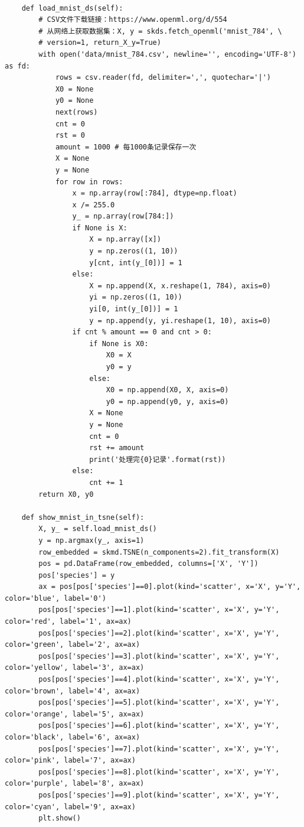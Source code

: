 \documentclass[UTF8]{article}
\begin{document}
\begin{lstlisting}
        
    def load_mnist_ds(self):
        # CSV文件下载链接：https://www.openml.org/d/554
        # 从网络上获取数据集：X, y = skds.fetch_openml('mnist_784', \
        # version=1, return_X_y=True)
        with open('data/mnist_784.csv', newline='', encoding='UTF-8') as fd:
            rows = csv.reader(fd, delimiter=',', quotechar='|')
            X0 = None
            y0 = None
            next(rows)
            cnt = 0
            rst = 0
            amount = 1000 # 每1000条记录保存一次
            X = None
            y = None
            for row in rows:
                x = np.array(row[:784], dtype=np.float)
                x /= 255.0
                y_ = np.array(row[784:])
                if None is X:
                    X = np.array([x])
                    y = np.zeros((1, 10))
                    y[cnt, int(y_[0])] = 1
                else:
                    X = np.append(X, x.reshape(1, 784), axis=0)
                    yi = np.zeros((1, 10))
                    yi[0, int(y_[0])] = 1
                    y = np.append(y, yi.reshape(1, 10), axis=0)
                if cnt % amount == 0 and cnt > 0:
                    if None is X0:
                        X0 = X
                        y0 = y
                    else:
                        X0 = np.append(X0, X, axis=0)
                        y0 = np.append(y0, y, axis=0)
                    X = None
                    y = None
                    cnt = 0
                    rst += amount
                    print('处理完{0}记录'.format(rst))
                else:
                    cnt += 1
        return X0, y0

    def show_mnist_in_tsne(self):
        X, y_ = self.load_mnist_ds()
        y = np.argmax(y_, axis=1)
        row_embedded = skmd.TSNE(n_components=2).fit_transform(X)
        pos = pd.DataFrame(row_embedded, columns=['X', 'Y'])
        pos['species'] = y
        ax = pos[pos['species']==0].plot(kind='scatter', x='X', y='Y', color='blue', label='0')
        pos[pos['species']==1].plot(kind='scatter', x='X', y='Y', color='red', label='1', ax=ax)
        pos[pos['species']==2].plot(kind='scatter', x='X', y='Y', color='green', label='2', ax=ax)
        pos[pos['species']==3].plot(kind='scatter', x='X', y='Y', color='yellow', label='3', ax=ax)
        pos[pos['species']==4].plot(kind='scatter', x='X', y='Y', color='brown', label='4', ax=ax)
        pos[pos['species']==5].plot(kind='scatter', x='X', y='Y', color='orange', label='5', ax=ax)
        pos[pos['species']==6].plot(kind='scatter', x='X', y='Y', color='black', label='6', ax=ax)
        pos[pos['species']==7].plot(kind='scatter', x='X', y='Y', color='pink', label='7', ax=ax)
        pos[pos['species']==8].plot(kind='scatter', x='X', y='Y', color='purple', label='8', ax=ax)
        pos[pos['species']==9].plot(kind='scatter', x='X', y='Y', color='cyan', label='9', ax=ax)
        plt.show()
\end{lstlisting}
\end{document}
